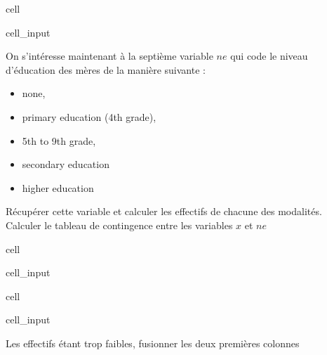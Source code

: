 \documentclass[letterpaper,10pt,french]{sphinxmanual}
\begin{document}
\begin{sphinxuseclass}{cell}
\begin{sphinxuseclass}{cell_input}
\begin{sphinxVerbatim}[commandchars=\\\{\}]
\end{sphinxVerbatim}

\end{sphinxuseclass}
\end{sphinxuseclass}
\sphinxAtStartPar
On s’intéresse maintenant à la septième variable \(ne\) qui code le niveau d’éducation des mères de la manière suivante :
\begin{itemize}
\item {} 
 \sphinxhyphen{} none,

\item {} 
 \sphinxhyphen{} primary education (4th grade),

\item {} 
 \sphinxhyphen{} 5th to 9th grade,

\item {} 
 \sphinxhyphen{} secondary education

\item {} 
 \sphinxhyphen{} higher education

\end{itemize}

\sphinxAtStartPar
Récupérer cette variable et calculer les effectifs de chacune des modalités. Calculer le tableau de contingence  entre les variables \(x\) et \(ne\)

\begin{sphinxuseclass}{cell}
\begin{sphinxuseclass}{cell_input}
\begin{sphinxVerbatim}[commandchars=\\\{\}]
\end{sphinxVerbatim}

\end{sphinxuseclass}
\end{sphinxuseclass}
\begin{sphinxuseclass}{cell}
\begin{sphinxuseclass}{cell_input}
\begin{sphinxVerbatim}[commandchars=\\\{\}]
\end{sphinxVerbatim}

\end{sphinxuseclass}
\end{sphinxuseclass}
\sphinxAtStartPar
Les effectifs étant trop faibles, fusionner les deux premières colonnes
\end{document}
